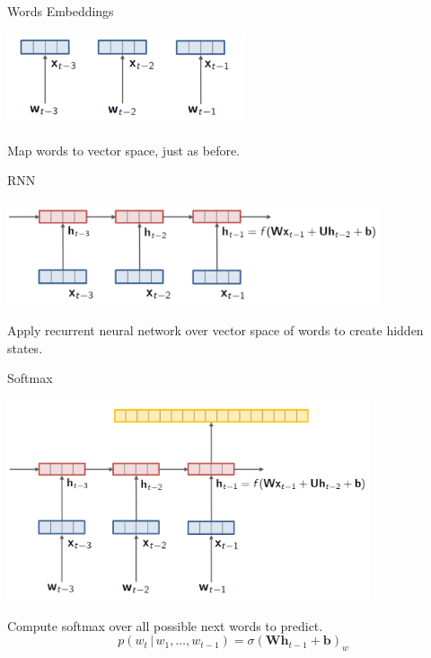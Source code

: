 \documentclass{beamer}
\let\tempone\itemize
\let\temptwo\enditemize
\renewenvironment{itemize}{\tempone\addtolength{\itemsep}{0.5\baselineskip}}{\temptwo}
\newcommand{\given}{\,|\,}
\begin{document}
\begin{frame}{Words Embeddings}
  \begin{center}
    \includegraphics[width=7cm]{emb}
  \end{center}
  \begin{itemize}
  \item Map words to vector space, just as before. 
  \end{itemize}

\end{frame}

\begin{frame}{RNN}
  \begin{center}
    \includegraphics[width=11cm]{rnn}
  \end{center}  
  \begin{itemize}
  \item Apply recurrent neural network over vector space of words to create hidden states.
  \end{itemize}
\end{frame}




\begin{frame}{Softmax}
  \begin{center}

    \includegraphics[width=0.8\textwidth]{rnnlm5}
  \end{center}
    
  \begin{itemize}
  \item Compute softmax over all possible next words to predict.
  \end{itemize}
  \[  p(w_t \given w_1, \ldots, w_{t-1}) = \sigma(\mathbf{W} \mathbf{h}_{t-1} + \mathbf{b})_w \] 

\end{frame}
\end{document}

